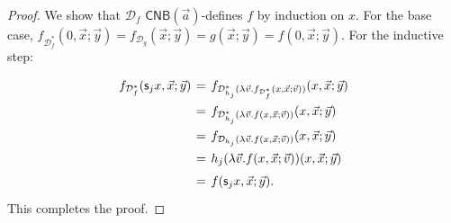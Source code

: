 \documentclass[manuscript,screen]{acmart}
\newcommand{\red}[1]{{\color{red}#1}}
\theoremstyle{definition}
\newtheorem{defn}[thm]{Definition}
\theoremstyle{remark}
\newcommand{\n}{N}
\newcommand{\sq}{\Box}
\newcommand{\sqn}{{\sq\n}}
\newcommand{\sn}{\sqn}
\renewcommand{\succ}[1]{\mathsf{s}_{#1}}
\newcommand{\denot}[1]{f_{#1}}
\newcommand{\bc}{\mathsf{B}}
\newcommand{\bcnorec}{\bc^{-}}
\newcommand{\nested}{\mathsf{N}}
\newcommand{\nbc}{\nested\bc}
\newcommand{\seqar}{\Rightarrow}
\newcommand{\der}{\mathcal{D}}
\newcommand{\cyclic}{\mathsf{C}}
\newcommand{\ncbc}{\cyclic\nested\bc}
\begin{document}
\begin{proof}
We show that $\der_f$ $\ncbc(\vec a)$-defines $f$  by induction on $x$. For the base case, $ \denot{\der^*_f}(0, \vec x; \vec y)=   \denot{\der_g}(\vec x; \vec y)= g(\vec x; \vec y)= f(0, \vec x; \vec y)$. For the inductive step:
\[
\renewcommand{\arraystretch}{1.5}
\arraycolsep=2pt
\begin{array}{rcl}
        \denot{\der^*_f}(\succ jx, \vec x; \vec y)&=&  \denot{\der^*_{h_j}(\lambda \vec v.  \denot{\der^*_f}(x, \vec x; \vec v) )}(x, \vec x; \vec y)  \\ 
     & =& \denot{\der^*_{h_j}( \lambda \vec v.  f(x, \vec x; \vec v) )}(x, \vec x; \vec y) \\
       & =& \denot{\der_{h_j}( \lambda \vec v.  f(x, \vec x; \vec v) )}(x, \vec x; \vec y) \\
       & =& h_j( \lambda \vec v.  f(x, \vec x; \vec v) )(x, \vec x; \vec y)\\
       &=& f(\succ j x, \vec x; \vec y) .
\end{array}
\]
This completes the proof.
\end{proof}




\end{document}
